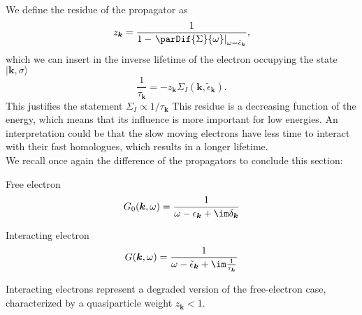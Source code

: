 \documentclass[../main.tex]{subfile}
\begin{document}
We define the residue of the propagator as 
\begin{equation}
    z_{\bm{k}} = \frac{1}{1- \left.\parDif{\Sigma}{\omega}\right|_{\omega = \tilde{\epsilon}_{\bm{k}}}}, \label{eq:residue}
\end{equation}
which we can insert in the inverse lifetime of the electron occupying the state $|\bm{k},\sigma\rangle$
\begin{equation*}
    \frac{1}{\tau_{\bm{k}}} = - z_{\bm{k}} \Sigma_I(\bm{k}, \tilde{\epsilon}_{\bm{k}}).
\end{equation*}
This justifies the statement $ \Sigma_I \propto 1/\tau_{\bm{k}}$
This residue is a decreasing function of the energy, which means that its influence is more important for low energies. 
An interpretation could be that the slow moving electrons have less time to interact with their fast homologues, which results in a
longer lifetime.\\

We recall once again the difference of the propagators to conclude this section:\vspace{12pt}\\
\begin{center}
\begin{minipage}{0.4\textwidth}
    \begin{center}
    Free electron
    \[G_0(\bm{k}, \omega) = \frac{1}{\omega- \epsilon_{\bm{k}}+\im \delta_{\bm{k}}}\]
\end{center}
\end{minipage}
\begin{minipage}{0.05\textwidth}
\end{minipage}
\begin{minipage}{0.4\textwidth}
    \begin{center}
        Interacting electron
    \[G(\bm{k}, \omega) = \frac{1}{\omega- \tilde{\epsilon}_{\bm{k}}+\im \frac{1}{\tau_{\bm{k}}}}\]
    \end{center}
\end{minipage}
\end{center}

Interacting electrons represent a degraded version of the free-electron case, characterized by a quasiparticle weight $z_{\bm{k}} < 1$.\\
\end{document}
